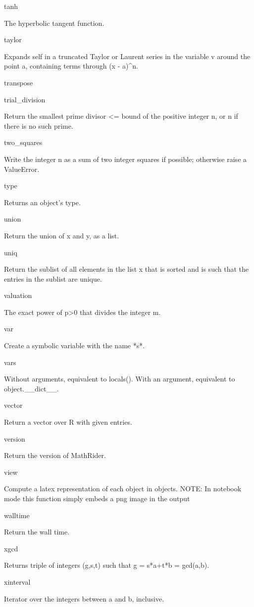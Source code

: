 \documentclass[12pt,oneside]{book}
\begin{document}
tanh

The hyperbolic tangent function.

taylor

Expands self in a truncated Taylor or Laurent series in the variable v around the point a, containing terms through (x {}- a)\^{}n.

transpose


trial\_division

Return the smallest prime divisor {\textless}= bound of the positive integer n, or n if there is no such prime.

two\_squares

Write the integer n as a sum of two integer squares if possible; otherwise raise a ValueError.

type

Returns an object's type.

union

Return the union of x and y, as a list.

uniq

Return the sublist of all elements in the list x that is sorted and is such that the entries in the sublist are unique.

valuation

The exact power of p{\textgreater}0 that divides the integer m.

var

Create a symbolic variable with the name *s*.

vars

Without arguments, equivalent to locals(). With an argument, equivalent to object.\_\_dict\_\_.

vector

Return a vector over R with given entries.

version

Return the version of MathRider.

view

Compute a latex representation of each object in objects. NOTE: In notebook mode this function simply embeds a png image in the output 

walltime

Return the wall time.

xgcd

Returns triple of integers (g,s,t) such that g = s*a+t*b = gcd(a,b).

xinterval

Iterator over the integers between a and b, inclusive.
\end{document}
